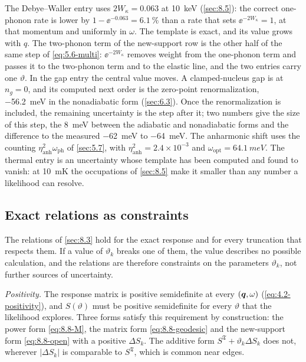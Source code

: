 The Debye--Waller entry uses $2W_\kappa = 0.063$ at \SI{10}{keV} (\cref{sec:8.5}): the correct one-phonon rate is lower by $1 - \ee^{-0.063} = \SI{6.1}{\percent}$ than a rate that sets $\ee^{-2W_\kappa} = 1$, at that momentum and uniformly in $\omega$. The template is exact, and its value grows with $q$. The two-phonon term of the new-support row is the other half of the same step of \cref{eq:5.6-multi}: $\ee^{-2W_\kappa}$ removes weight from the one-phonon term and passes it to the two-phonon term and to the elastic line, and the two entries carry one $\vartheta$. In the gap entry the central value moves. A clamped-nucleus gap is at $n_g = 0$, and its computed next order is the zero-point renormalization, \SI{-56.2}{meV} in the nonadiabatic form (\cref{sec:6.3}). Once the renormalization is included, the remaining uncertainty is the step after it; two numbers give the size of this step, the \SI{8}{meV} between the adiabatic and nonadiabatic forms and the difference to the measured \SI{-62}{meV} to \SI{-64}{meV}. The anharmonic shift uses the counting $\eta_{\mathrm{anh}}^2\omega_{\mathrm{ph}}$ of \cref{sec:5.7}, with $\eta_{\mathrm{anh}}^2 = 2.4\times10^{-3}$ and $\omega_{\mathrm{opt}} = \SI{64.1}{meV}$. The thermal entry is an uncertainty whose template has been computed and found to vanish: at \SI{10}{mK} the occupations of \cref{sec:8.5} make it smaller than any number a likelihood can resolve.

\subsection{Exact relations as constraints}

The relations of \cref{sec:8.3} hold for the exact response and for every truncation that respects them. If a value of $\vartheta_k$ breaks one of them, the value describes no possible calculation, and the relations are therefore constraints on the parameters $\vartheta_k$, not further sources of uncertainty.

\emph{Positivity.} The response matrix is positive semidefinite at every $(\bm{q},\omega)$ (\cref{eq:4.2-positivity}), and $S(\vartheta)$ must be positive semidefinite for every $\vartheta$ that the likelihood explores. Three forms satisfy this requirement by construction: the power form \cref{eq:8.8-M}, the matrix form \cref{eq:8.8-geodesic} and the new-support form \cref{eq:8.8-open} with a positive $\Delta S_k$. The additive form $S^{\mathfrak{T}} + \vartheta_k\Delta S_k$ does not, wherever $|\Delta S_k|$ is comparable to $S^{\mathfrak{T}}$, which is common near edges.

